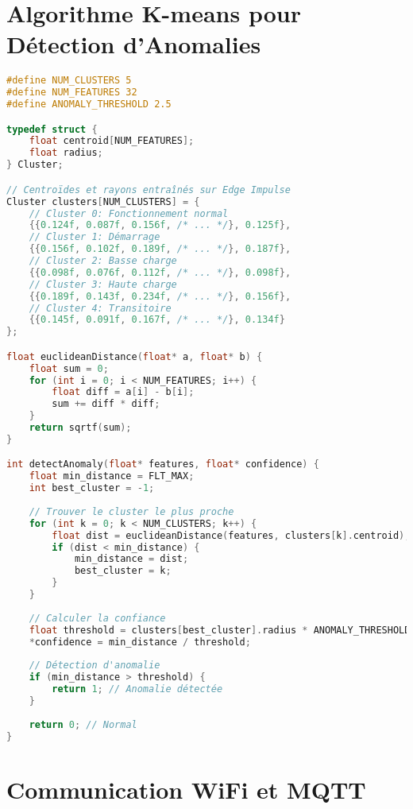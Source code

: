 \section{Algorithme K-means pour Détection d'Anomalies}

\begin{lstlisting}[language=C, caption=Implémentation K-means optimisée]
#define NUM_CLUSTERS 5
#define NUM_FEATURES 32
#define ANOMALY_THRESHOLD 2.5

typedef struct {
    float centroid[NUM_FEATURES];
    float radius;
} Cluster;

// Centroïdes et rayons entraînés sur Edge Impulse
Cluster clusters[NUM_CLUSTERS] = {
    // Cluster 0: Fonctionnement normal
    {{0.124f, 0.087f, 0.156f, /* ... */}, 0.125f},
    // Cluster 1: Démarrage
    {{0.156f, 0.102f, 0.189f, /* ... */}, 0.187f},
    // Cluster 2: Basse charge
    {{0.098f, 0.076f, 0.112f, /* ... */}, 0.098f},
    // Cluster 3: Haute charge
    {{0.189f, 0.143f, 0.234f, /* ... */}, 0.156f},
    // Cluster 4: Transitoire
    {{0.145f, 0.091f, 0.167f, /* ... */}, 0.134f}
};

float euclideanDistance(float* a, float* b) {
    float sum = 0;
    for (int i = 0; i < NUM_FEATURES; i++) {
        float diff = a[i] - b[i];
        sum += diff * diff;
    }
    return sqrtf(sum);
}

int detectAnomaly(float* features, float* confidence) {
    float min_distance = FLT_MAX;
    int best_cluster = -1;
    
    // Trouver le cluster le plus proche
    for (int k = 0; k < NUM_CLUSTERS; k++) {
        float dist = euclideanDistance(features, clusters[k].centroid);
        if (dist < min_distance) {
            min_distance = dist;
            best_cluster = k;
        }
    }
    
    // Calculer la confiance
    float threshold = clusters[best_cluster].radius * ANOMALY_THRESHOLD;
    *confidence = min_distance / threshold;
    
    // Détection d'anomalie
    if (min_distance > threshold) {
        return 1; // Anomalie détectée
    }
    
    return 0; // Normal
}
\end{lstlisting}

\section{Communication WiFi et MQTT}

